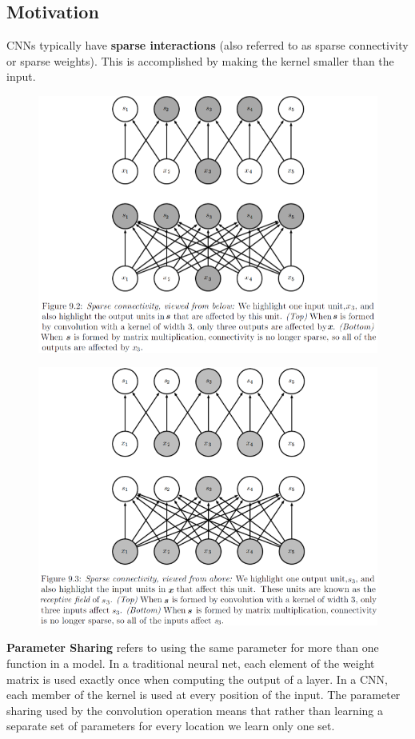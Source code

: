 \begin{multicols}{2}
	\subsection{Motivation}
	CNNs typically have \textbf{sparse interactions} (also referred to as sparse connectivity or sparse weights).
	This is accomplished by making the kernel smaller than the input.
	\begin{figure}[H]
		\centering
		\includegraphics[width=0.85\linewidth]{images/sparse1.png}
	\end{figure}
	\begin{figure}[H]
		\centering
		\includegraphics[width=0.85\linewidth]{images/sparse2.png}
	\end{figure}

	\textbf{Parameter Sharing} refers to using the same parameter for more than one function in a model.
	In a traditional neural net, each element of the weight matrix is used exactly once when computing the output of a layer.
	In a CNN, each member of the kernel is used at every position of the input.
	The parameter sharing used by the convolution operation means that rather than learning a separate set of parameters for every location we learn only one set.\\


\end{multicols}
